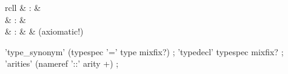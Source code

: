 \begin{isabellebody}
\begin{isamarkuptext}
\begin{description}
  \end{description}%
\end{isamarkuptext}%
\isamarkuptrue%
%
\isamarkuptrue%
%
\begin{isamarkuptext}%
\begin{matharray}{rcll}
    \hypertarget{command.type-synonym}{\hyperlink{command.type-synonym}{\mbox{}}} & : &  \\
    \hypertarget{command.typedecl}{\hyperlink{command.typedecl}{\mbox{}}} & : &  \\
    \hypertarget{command.arities}{\hyperlink{command.arities}{\mbox{}}} & : &  & (axiomatic!) \\
  \end{matharray}

  \begin{rail}
    'type_synonym' (typespec '=' type mixfix?)
    ;
    'typedecl' typespec mixfix?
    ;
    'arities' (nameref '::' arity +)
    ;
  \end{rail}

  \begin{description}


\end{description}
\end{isamarkuptext}
\end{isabellebody}
